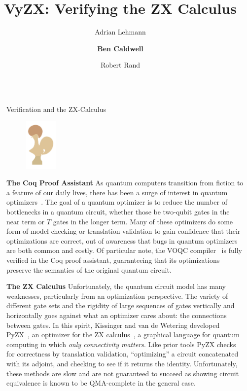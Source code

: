 \documentclass[final]{beamer}
\title{VyZX: Verifying the ZX Calculus}
\author{Adrian Lehmann \and \textbf{Ben Caldwell} \and Robert Rand}
\institute[shortinst]{University of Chicago}
\newlength{\sepwidth}
\newlength{\colwidth}
\newcommand{\separatorcolumn}{\begin{column}{\sepwidth}\end{column}}
\newcommand{\pyZX}{PyZX\xspace}
\newcommand{\VOQC}{V{\small OQC}\xspace}
\begin{document}
\begin{frame}[t]
\begin{columns}[t]
\separatorcolumn

\begin{column}{\colwidth}

  \begin{block}{Verification and the ZX-Calculus}

\begin{figure}
  \begin{center}
    \includegraphics[width=0.15\textwidth]{logos/coq-logo-medium.png}
  \end{center}
\end{figure}
%
\textbf{The Coq Proof Assistant} 
    As quantum computers transition from fiction to a feature of our daily lives, there has been a surge of interest in quantum optimizers~\cite{kissinger2020Pyzx}. 
    The goal of a quantum optimizer is to reduce the number of bottlenecks in a quantum circuit, whether those be two-qubit gates in the near term or $T$ gates in the longer term. 
    Many of these optimizers do some form of model checking or translation validation to gain confidence that their optimizations are correct, out of awareness that bugs in quantum optimizers are both common and costly. 
    Of particular note, the \VOQC compiler~\cite{hietala-et-al-2021-VOQC} is fully verified in the Coq proof assistant, guaranteeing that its optimizations preserve the semantics of the original quantum circuit.

    \textbf{The ZX Calculus}
    Unfortunately, the quantum circuit model has many weaknesses, particularly from an optimization perspective. 
    The variety of different gate sets and the rigidity of large sequences of gates vertically and horizontally goes against what an optimizer cares about: the connections between gates.
    In this spirit, Kissinger and van de Wetering developed PyZX~\cite{kissinger2020Pyzx}, an optimizer for the ZX calculus~\cite{coecke-duncan-zx}, a graphical language for quantum computing in which \emph{only connectivity matters}. 
    Like prior tools \pyZX checks for correctness by translation validation, ``optimizing'' a circuit concatenated with its adjoint, and checking to see if it returns the identity.
    Unfortunately, these methods are slow and are not guaranteed to succeed as showing circuit equivalence is known to be QMA-complete in the general case.


\end{block}
\end{column}
\end{columns}
\end{frame}
\end{document}
